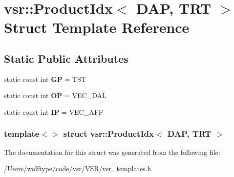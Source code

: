 \hypertarget{structvsr_1_1_product_idx_3_01_d_a_p_00_01_t_r_t_01_4}{\section{vsr\-:\-:Product\-Idx$<$ D\-A\-P, T\-R\-T $>$ Struct Template Reference}
\label{structvsr_1_1_product_idx_3_01_d_a_p_00_01_t_r_t_01_4}
}
\subsection*{Static Public Attributes}
\begin{DoxyCompactItemize}
\item 
\hypertarget{structvsr_1_1_product_idx_3_01_d_a_p_00_01_t_r_t_01_4_a1073a2440041594862869febb2c23f84}{static const int {\bfseries G\-P} = T\-S\-T}\label{structvsr_1_1_product_idx_3_01_d_a_p_00_01_t_r_t_01_4_a1073a2440041594862869febb2c23f84}

\item 
\hypertarget{structvsr_1_1_product_idx_3_01_d_a_p_00_01_t_r_t_01_4_a85d45ec473e400b2242610cc0f78028c}{static const int {\bfseries O\-P} = V\-E\-C\-\_\-\-D\-A\-L}\label{structvsr_1_1_product_idx_3_01_d_a_p_00_01_t_r_t_01_4_a85d45ec473e400b2242610cc0f78028c}

\item 
\hypertarget{structvsr_1_1_product_idx_3_01_d_a_p_00_01_t_r_t_01_4_a9dd5cb7d79cf7be1aaf3688092a1e17d}{static const int {\bfseries I\-P} = V\-E\-C\-\_\-\-A\-F\-F}\label{structvsr_1_1_product_idx_3_01_d_a_p_00_01_t_r_t_01_4_a9dd5cb7d79cf7be1aaf3688092a1e17d}

\end{DoxyCompactItemize}
\subsubsection*{template$<$$>$ struct vsr\-::\-Product\-Idx$<$ D\-A\-P, T\-R\-T $>$}



The documentation for this struct was generated from the following file\-:\begin{DoxyCompactItemize}
\item 
/\-Users/wolftype/code/vsr/\-V\-S\-R/vsr\-\_\-templates.\-h\end{DoxyCompactItemize}
